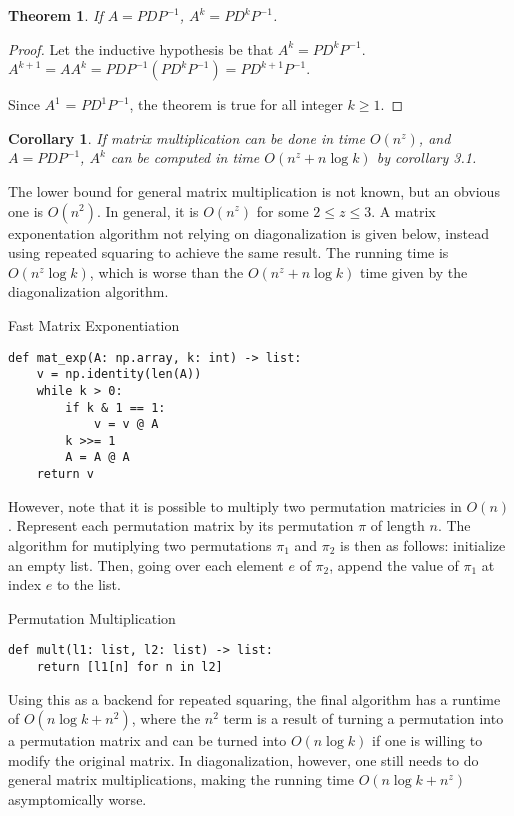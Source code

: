 \documentclass[11pt, oneside]{article}
\theoremstyle{plain}
\newtheorem{theorem}{Theorem}[section]
\newtheorem{corollary}{Corollary}[theorem]
\theoremstyle{definition}
\begin{document}
\begin{theorem}
If \( A = P D P^{-1} \), \( A^k = P D^k P^{-1} \).
\end{theorem}
\begin{proof}
Let the inductive hypothesis be that \( A^k = P D^k P^{-1} \). \\
\( A^{k + 1} = A A^{k} = P D P^{-1}(P D^k P^{-1}) = P D^{k + 1} P^{-1} \).

Since \( A^1 \) = \( P D^1 P^{-1} \), the theorem is true for all integer \( k \geq 1 \).
\end{proof}

\begin{corollary}
If matrix multiplication can be done in time \( O(n^z) \),
and \( A = PDP^{-1} \), \( A^k \) can be computed in time \( O(n^z + n \log k ) \)
by corollary 3.1.
\end{corollary}

The lower bound for general matrix multiplication is not known, but an obvious one is
\( O(n^2) \). In general, it is \( O(n^z) \) for some \( 2 \leq z \leq 3 \).
A matrix exponentation algorithm not relying on diagonalization is given
below, instead using repeated squaring to achieve the same result.
The running time is \( O(n^z \log k) \), which is worse than the
\( O(n^z + n \log k ) \) time given by the diagonalization algorithm.

\begin{algorithm}
\caption{Fast Matrix Exponentiation}
\begin{verbatim}
def mat_exp(A: np.array, k: int) -> list:
    v = np.identity(len(A))
    while k > 0:
        if k & 1 == 1:
            v = v @ A
        k >>= 1
        A = A @ A
    return v
\end{verbatim}
\end{algorithm}

However, note that it is possible to multiply two permutation matricies
in \( O(n) \).
Represent each permutation matrix by its permutation \( \pi \) of length \( n \).
The algorithm for mutiplying two permutations \( \pi_1 \) and \( \pi_2 \) is then
as follows: initialize an empty list. Then, going over each element \( e \) of \( \pi_2 \), append the value of \( \pi_1 \) at index \( e \) to the list.

\begin{algorithm}
\caption{Permutation Multiplication}
\begin{verbatim}
def mult(l1: list, l2: list) -> list:
    return [l1[n] for n in l2]
\end{verbatim}
\end{algorithm}

Using this as a backend for repeated squaring, the final algorithm has a runtime
of \( O(n \log k + n^2) \), where the \( n^2 \) term is a result of
turning a permutation into a permutation matrix and can be turned into
\( O(n \log k) \) if one is willing to modify the original matrix.
In diagonalization, however, one still needs to do general matrix multiplications,
making the running time \( O(n \log k + n^z) \) asymptomically worse.

\printbibliography
\end{document}
